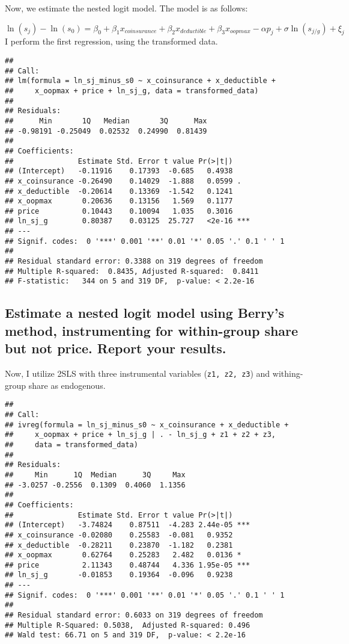 \documentclass[]{article}
\begin{document}
Now, we estimate the nested logit model. The model is as follows:

\[
\ln(s_j) - \ln(s_0) = \beta_0 + \beta_1 x_{coinsurance} + \beta_2 x_{deductible} + \beta_3 x_{oopmax} - \alpha p_j + \sigma \ln(s_{j/g}) + \xi_j
\] I perform the first regression, using the transformed data.

\begin{verbatim}
## 
## Call:
## lm(formula = ln_sj_minus_s0 ~ x_coinsurance + x_deductible + 
##     x_oopmax + price + ln_sj_g, data = transformed_data)
## 
## Residuals:
##      Min       1Q   Median       3Q      Max 
## -0.98191 -0.25049  0.02532  0.24990  0.81439 
## 
## Coefficients:
##               Estimate Std. Error t value Pr(>|t|)    
## (Intercept)   -0.11916    0.17393  -0.685   0.4938    
## x_coinsurance -0.26490    0.14029  -1.888   0.0599 .  
## x_deductible  -0.20614    0.13369  -1.542   0.1241    
## x_oopmax       0.20636    0.13156   1.569   0.1177    
## price          0.10443    0.10094   1.035   0.3016    
## ln_sj_g        0.80387    0.03125  25.727   <2e-16 ***
## ---
## Signif. codes:  0 '***' 0.001 '**' 0.01 '*' 0.05 '.' 0.1 ' ' 1
## 
## Residual standard error: 0.3388 on 319 degrees of freedom
## Multiple R-squared:  0.8435, Adjusted R-squared:  0.8411 
## F-statistic:   344 on 5 and 319 DF,  p-value: < 2.2e-16
\end{verbatim}

\hypertarget{estimate-a-nested-logit-model-using-berrys-method-instrumenting-for-within-group-share-but-not-price.-report-your-results.}{%
\subsection{Estimate a nested logit model using Berry's method,
instrumenting for within-group share but not price. Report your
results.}\label{estimate-a-nested-logit-model-using-berrys-method-instrumenting-for-within-group-share-but-not-price.-report-your-results.}}

Now, I utilize 2SLS with three instrumental variables
(\texttt{z1,\ z2,\ z3}) and withing-group share as endogenous.

\begin{verbatim}
## 
## Call:
## ivreg(formula = ln_sj_minus_s0 ~ x_coinsurance + x_deductible + 
##     x_oopmax + price + ln_sj_g | . - ln_sj_g + z1 + z2 + z3, 
##     data = transformed_data)
## 
## Residuals:
##     Min      1Q  Median      3Q     Max 
## -3.0257 -0.2556  0.1309  0.4060  1.1356 
## 
## Coefficients:
##               Estimate Std. Error t value Pr(>|t|)    
## (Intercept)   -3.74824    0.87511  -4.283 2.44e-05 ***
## x_coinsurance -0.02080    0.25583  -0.081   0.9352    
## x_deductible  -0.28211    0.23870  -1.182   0.2381    
## x_oopmax       0.62764    0.25283   2.482   0.0136 *  
## price          2.11343    0.48744   4.336 1.95e-05 ***
## ln_sj_g       -0.01853    0.19364  -0.096   0.9238    
## ---
## Signif. codes:  0 '***' 0.001 '**' 0.01 '*' 0.05 '.' 0.1 ' ' 1
## 
## Residual standard error: 0.6033 on 319 degrees of freedom
## Multiple R-Squared: 0.5038,  Adjusted R-squared: 0.496 
## Wald test: 66.71 on 5 and 319 DF,  p-value: < 2.2e-16
\end{verbatim}
\end{document}
